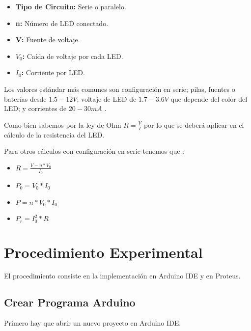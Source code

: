 \documentclass{article}
\begin{document}
    \begin{itemize}
        \item \textbf{Tipo de Circuito:} Serie o paralelo.
        \item \textbf{n:} Número de LED conectado.
        \item \textbf{V:} Fuente de voltaje.
        \item \textbf{$V_0$:} Caída de voltaje por cada LED\@.
        \item \textbf{$I_0$:} Corriente por LED\@.
    \end{itemize}

    Los valores estándar más comunes son configuración en serie; pilas,
    fuentes o baterías desde $1.5-12V$; voltaje de LED de $1.7-3.6V$ que
    depende del color del LED; y corrientes de $20-30mA$ \cite{szyk-2022}.

    \bigbreak

    Como bien sabemos por la ley de Ohm $R = \frac{V}{I}$ por lo que se
    deberá aplicar en el cálculo de la resistencia del LED\@.

    \bigbreak

    Para otros cálculos con configuración en serie tenemos que \cite{szyk-2022}:

    \begin{itemize}
        \item $R = \frac{V - n*V_0}{I_0}$
        \item $P_0 = V_0 * I_0$
        \item $P = n * V_0 * I_0$
        \item $P_r = I_0^2 * R$
    \end{itemize}

    \section{Procedimiento Experimental}\label{sec:procedimiento-experimental}

    El procedimiento consiste en la implementación en Arduino IDE y en Proteus.

    \subsection{Crear Programa Arduino}\label{subsec:crear-programa-arduino}

    Primero hay que abrir un nuevo proyecto en Arduino IDE.
\end{document}
